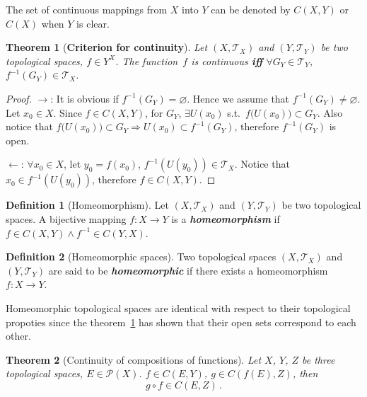 \documentclass[openany]{book}
\newcommand*{\indexbf}[1]{\emph{\textbf{#1}}\index{#1}} %
\theoremstyle{plain}
\newtheorem{theorem}{Theorem}[section] %
\theoremstyle{definition}
\newtheorem{definition}{Definition}[section] %
\newcommand{\emphbf}[1]{\emph{\textbf{#1}}}
\begin{document}
The set of continuous mappings from $X$ into $Y$ can be denoted by $C(X, Y)$ or $C(X)$ when $Y$ is clear. 

\begin{theorem}[\textbf{Criterion for continuity}]
	\label{theorem: criterion of continuity}
	Let $(X, \mathscr T_X)$ and $(Y, \mathscr T_Y)$ be two topological spaces, $f \in Y^X$. 
	The function~$f$ is continuous \emphbf{iff} $\forall G_Y \in \mathscr T_Y$, $f^{-1} (G_Y) \in \mathscr T_X$.
\end{theorem}
\begin{proof}
	$\to$: 
	It is obvious if $f^{-1}(G_Y) = \varnothing$. 
	Hence we assume that $f^{-1}(G_Y) \neq \varnothing$. 
	Let $x_0 \in X$. 
	Since $f \in C(X, Y)$, for $G_Y$, $\exists U( x_0) $ s.t.\ $f\big(U(x_0) \big) \subset G_Y$. 
	Also notice that $f\big(U(x_0) \big) \subset G_Y \Rightarrow  U(x_0) \subset f^{-1}(G_Y)$, therefore $f^{-1}(G_Y)$ is open.

	$\gets$: 
	$\forall x_0 \in X$, let $y_0 = f(x_0)$, $f^{-1} (U( y_0)) \in \mathscr T_X$. 
	Notice that $x_0 \in f^{-1}(U( y_0))$, therefore $f \in C(X, Y) $.
\end{proof}

\begin{definition}[Homeomorphism]\label{definition: homeomorphism}
	Let $(X, \mathscr T_X)$ and $(Y, \mathscr T_Y)$ be two topological spaces. 
	A bijective mapping $f \colon X \to Y$ is a \indexbf{homeomorphism} if $f \in C(X, Y) \wedge f^{-1} \in C(Y, X)$. 
\end{definition}

\begin{definition}[Homeomorphic spaces]\label{definition: homeomorphic}
	Two topological spaces $(X,\mathscr T_X)$ and $(Y,\mathscr T_Y)$ are said to be \indexbf{homeomorphic} if there exists a homeomorphism $f \colon X \to Y$.
\end{definition}

Homeomorphic topological spaces are identical with respect to their topological propoties since the theorem~\ref{theorem: criterion of continuity} has shown that their open sets correspond to each other.

\begin{theorem}[Continuity of compositions of functions]
	Let $X$, $Y$, $Z$ be three topological spaces, $E \in \mathscr P(X)$. 
	$f \in C(E, Y)$, $g \in C(f(E), Z)$, then
	\begin{equation*}
		g \circ f \in C(E, Z) \,.
	\end{equation*}
\end{theorem}
\end{document}
